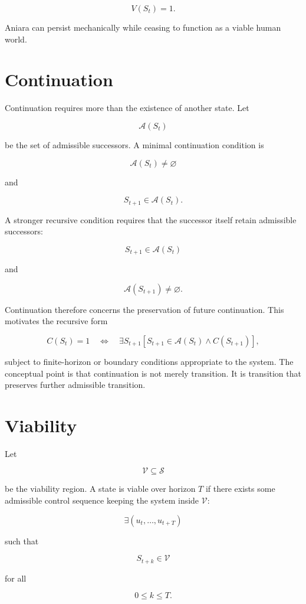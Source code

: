 \documentclass[11pt,oneside]{book}
\theoremstyle{definition}
\theoremstyle{remark}
\begin{document}
\[
V(S_t)=1.
\]

Aniara can persist mechanically while ceasing to function as a viable human world.

\section{Continuation}

Continuation requires more than the existence of another state. Let

\[
\mathcal{A}(S_t)
\]

be the set of admissible successors. A minimal continuation condition is

\[
\mathcal{A}(S_t)\neq\varnothing
\]

and

\[
S_{t+1}\in\mathcal{A}(S_t).
\]

A stronger recursive condition requires that the successor itself retain admissible successors:

\[
S_{t+1}\in\mathcal{A}(S_t)
\]

and

\[
\mathcal{A}(S_{t+1})\neq\varnothing.
\]

Continuation therefore concerns the preservation of future continuation. This motivates the
recursive form

\[
C(S_t) = 1 \quad\Longleftrightarrow\quad \exists S_{t+1} \left[ S_{t+1}\in\mathcal{A}(S_t) \land C(S_{t+1}) \right],
\]

subject to finite-horizon or boundary conditions appropriate to the system. The conceptual point is
that continuation is not merely transition. It is transition that preserves further admissible
transition.

\section{Viability}

Let

\[
\mathcal{V}\subseteq\mathcal{S}
\]

be the viability region. A state is viable over horizon \(T\) if there exists some admissible
control sequence keeping the system inside \(\mathcal{V}\):

\[
\exists (u_t,\ldots,u_{t+T})
\]

such that

\[
S_{t+k}\in\mathcal{V}
\]

for all

\[
0\leq k\leq T.
\]
\end{document}
